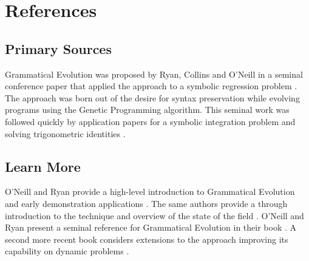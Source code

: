 \documentclass[a4paper, 11pt]{article}
\begin{document}



\section{References}
\label{sec:references}

% 
% 
\subsection{Primary Sources}
Grammatical Evolution was proposed by Ryan, Collins and O'Neill in a seminal conference paper that applied the approach to a symbolic regression problem \cite{Ryan1998a}. 
The approach was born out of the desire for syntax preservation while evolving programs using the Genetic Programming algorithm.
This seminal work was followed quickly by application papers for a symbolic integration problem \cite{O'Neill1998, O'Neill1998a} and solving trigonometric identities \cite{Ryan1998}.

% 
% 
\subsection{Learn More}
O'Neill and Ryan provide a high-level introduction to Grammatical Evolution and early demonstration applications \cite{O'Neill1999}. The same authors provide a through introduction to the technique and overview of the state of the field \cite{O'Neill2001}.
O'Neill and Ryan present a seminal reference for Grammatical Evolution in their book \cite{O'Neill2003}. A second more recent book considers extensions to the approach improving its capability on dynamic problems \cite{Dempsey2009}. 
\end{document}
